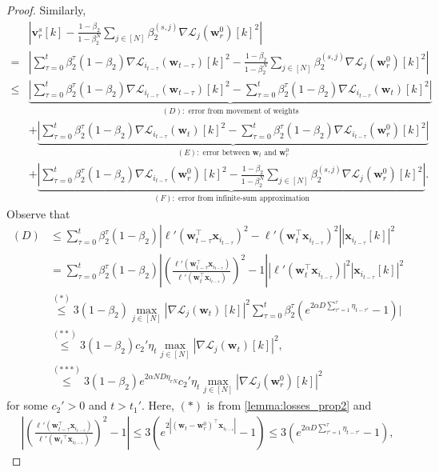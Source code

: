 \documentclass{article} %
\theoremstyle{plain}
\theoremstyle{definition}
\theoremstyle{remark}
\def\bigopen#1{\left(#1\right)}
\newcommand{\Ls}{\mathcal{L}}
\def\bx{{\mathbf x}}
\def\bw{{\mathbf w}}
\def\bv{{\mathbf v}}
\begin{document}
\begin{proof}
    Similarly,
    \begin{align*}
        &|\bv_r^s[k]-\frac{1-\beta_2}{1-\beta_2^N}\sum_{j \in [N]}\beta_2^{(s, j)}\nabla\Ls_{j}(\bw_r^0)[k]^2| \\
        =& |\sum_{\tau=0}^{t}\beta_2^\tau(1-\beta_2)\nabla \Ls_{i_{t-\tau}}(\bw_{t-\tau})[k]^2 - \frac{1-\beta_2}{1-\beta_2^N}\sum_{j \in [N]}\beta_2^{(s, j)}\nabla\Ls_{j}(\bw_r^0)[k]^2| \\
        \leq& \underbrace{|\sum_{\tau=0}^{t}\beta_2^\tau(1-\beta_2)\nabla \Ls_{i_{t-\tau}}(\bw_{t-\tau})[k]^2 - \sum_{\tau=0}^{t}\beta_2^\tau(1-\beta_2)\nabla \Ls_{i_{t-\tau}}(\bw_t)[k]^2|}_{(D): \text{ error from movement of weights}} \\
        &+ \underbrace{|\sum_{\tau=0}^{t}\beta_2^\tau(1-\beta_2)\nabla \Ls_{i_{t-\tau}}(\bw_t)[k]^2 - \sum_{\tau=0}^{t}\beta_2^\tau(1-\beta_2)\nabla \Ls_{i_{t-\tau}}(\bw_r^0)[k]^2|}_{(E): \text{ error between $\bw_t$ and $\bw_r^0$}}\\
        &+ \underbrace{|\sum_{\tau=0}^{t}\beta_2^\tau(1-\beta_2)\nabla \Ls_{i_{t-\tau}}(\bw_r^0)[k]^2 - \frac{1-\beta_2}{1-\beta_2^N}\sum_{j \in [N]}\beta_2^{(s, j)}\nabla\Ls_{j}(\bw_r^0)[k]^2|}_{(F): \text{ error from infinite-sum approximation}}.
    \end{align*}
    Observe that
    \begin{align*}
        (D)&\leq \sum_{\tau=0}^t \beta_2^\tau(1-\beta_2)|\ell'(\bw_{t-\tau}^\top \bx_{i_{t-\tau}})^2 - \ell'(\bw_t^\top \bx_{i_{t-\tau}})^2||\bx_{i_{t-\tau}}[k]|^2 \\
        &= \sum_{\tau=0}^t \beta_2^\tau(1-\beta_2)\left| \bigopen{\frac{\ell'(\bw_{t-\tau}^\top \bx_{i_{t-\tau}})}{\ell'(\bw_t^\top \bx_{i_{t-\tau}})}}^2 - 1\right||\ell'(\bw_t^\top \bx_{i_{t-\tau}})|^2|\bx_{i_{t-\tau}}[k]|^2 \\
        & \overset{(*)}{\leq} 3(1-\beta_2)\max_{j \in [N]}|\nabla \Ls_j(\bw_t)[k]|^2\sum_{\tau=0}^t \beta_2^\tau(e^{2\alpha D\sum_{\tau'=1}^\tau \eta_{t-\tau'}}-1)|\\
        & \overset{(**)}{\leq} 3(1-\beta_2)c_2'\eta_t\max_{j \in [N]}|\nabla \Ls_j(\bw_t)[k]|^2, \\
        & \overset{(***)}{\leq}3(1-\beta_2)e^{2\alpha ND \eta_{rN}}c_2'\eta_t\max_{j \in [N]}|\nabla \Ls_j(\bw_r^0)[k]|^2
    \end{align*}
    for some $c_2'>0$ and $t >t_1'$. Here, $(*)$ is from \cref{lemma:losses_prop2} and 
    \begin{align*}
        \left|\bigopen{\frac{\ell'(\bw_{t-\tau}^\top \bx_{i_{t-\tau}})}{\ell'({\bw_t}^\top \bx_{i_{t-\tau}})}}^2 - 1\right| \leq 3(e^{2|(\bw_t-\bw_r^0)^\top \bx_{i_{t-\tau}}|}-1) \leq 3(e^{2\alpha D\sum_{\tau'=1}^\tau \eta_{t-\tau'}}-1),

\end{align*}
\end{proof}
\end{document}
